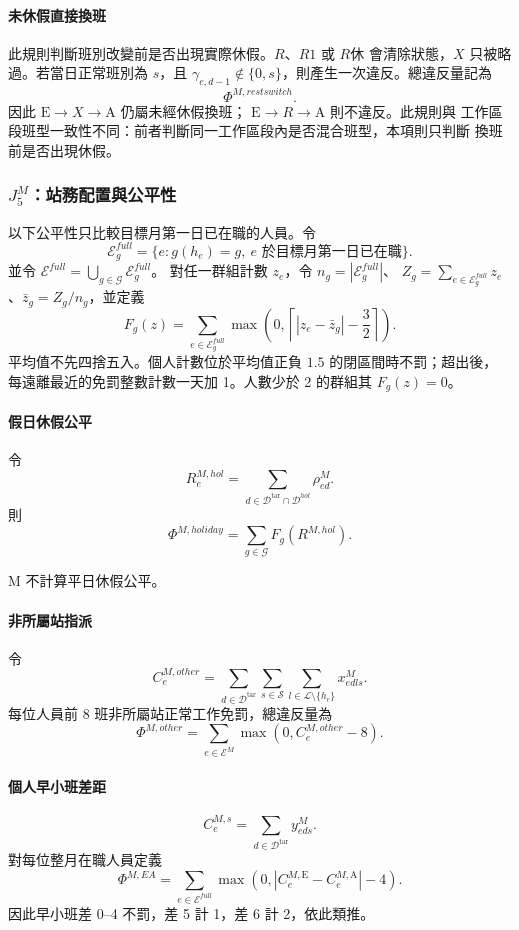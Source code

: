 \documentclass[a4paper,12pt]{article}
\begin{document}
\paragraph{未休假直接換班}
此規則判斷班別改變前是否出現實際休假。\(R\)、\(R1\) 或 \(R休\) 會清除狀態，\(X\)
只被略過。若當日正常班別為 \(s\)，且
\(\gamma_{e,d-1}\notin\{0,s\}\)，則產生一次違反。總違反量記為
\[
  \Phi^{M,restswitch}.
\]
因此 \(\mathrm{E}\rightarrow X\rightarrow\mathrm{A}\) 仍屬未經休假換班；
\(\mathrm{E}\rightarrow R\rightarrow\mathrm{A}\) 則不違反。此規則與
工作區段班型一致性不同：前者判斷同一工作區段內是否混合班型，本項則只判斷
換班前是否出現休假。

\subsubsection{\texorpdfstring{$J^M_5$}{J5}：站務配置與公平性}

以下公平性只比較目標月第一日已在職的人員。令
\[
  \mathcal E^{full}_g=\{e:g(h_e)=g,\ e\text{ 於目標月第一日已在職}\}.
\]
並令 \(\mathcal E^{full}=\bigcup_{g\in\mathcal G}\mathcal E^{full}_g\)。
對任一群組計數 $z_e$，令 $n_g=|\mathcal E^{full}_g|$、
$Z_g=\sum_{e\in\mathcal E^{full}_g}z_e$、$\bar z_g=Z_g/n_g$，並定義
\[
  F_g(z)
  =
  \sum_{e\in\mathcal E^{full}_g}
  \max\left(0,\left\lceil |z_e-\bar z_g|-\frac{3}{2}\right\rceil\right).
\]
平均值不先四捨五入。個人計數位於平均值正負 $1.5$ 的閉區間時不罰；超出後，
每遠離最近的免罰整數計數一天加 1。人數少於 2 的群組其 $F_g(z)=0$。

\paragraph{假日休假公平}
令
\[
  R^{M,hol}_{e}
  =
  \sum_{d\in\mathcal{D}^{\mathrm{tar}}\cap\mathcal{D}^{hol}}
  \rho^{M}_{ed}.
\]
則
\[
  \Phi^{M,holiday}
  =
  \sum_{g\in\mathcal{G}}F_g(R^{M,hol}).
\]

M 不計算平日休假公平。

\paragraph{非所屬站指派}
令
\[
  C^{M,other}_e
  =
  \sum_{d\in\mathcal{D}^{\mathrm{tar}}}
  \sum_{s\in\mathcal S}
  \sum_{l\in\mathcal L\setminus\{h_e\}}x^{M}_{edls}.
\]
每位人員前 8 班非所屬站正常工作免罰，總違反量為
\[
  \Phi^{M,other}
  =
  \sum_{e\in\mathcal E^M}\max(0,C^{M,other}_e-8).
\]

\paragraph{個人早小班差距}
\[
  C^{M,s}_e=\sum_{d\in\mathcal{D}^{\mathrm{tar}}}y^{M}_{eds}.
\]
對每位整月在職人員定義
\[
  \Phi^{M,EA}
  =\sum_{e\in\mathcal E^{full}}
  \max\left(0,\left|C^{M,\mathrm E}_e-C^{M,\mathrm A}_e\right|-4\right).
\]
因此早小班差 0--4 不罰，差 5 計 1，差 6 計 2，依此類推。
\end{document}
